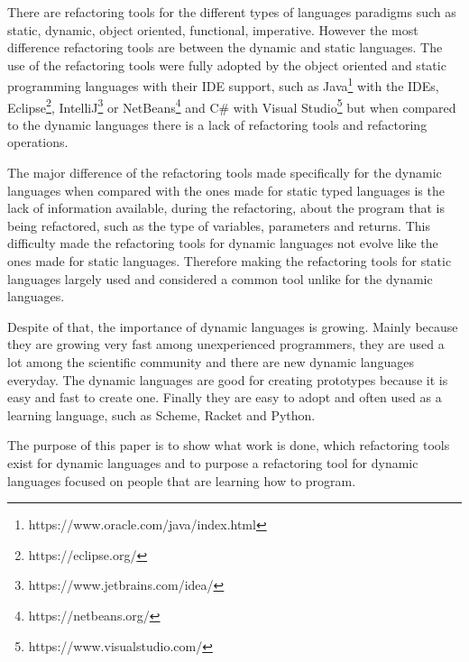 There are refactoring tools for the different types of languages paradigms such as static, dynamic, object oriented, functional, imperative. However the most difference refactoring tools are between the dynamic and static languages. The use of the refactoring tools were fully adopted by the object oriented and static programming languages with their IDE support, such as Java\footnote{https://www.oracle.com/java/index.html} with the IDEs, Eclipse\footnote{https://eclipse.org/}, IntelliJ\footnote{https://www.jetbrains.com/idea/} or NetBeans\footnote{https://netbeans.org/} and C\# with Visual Studio\footnote{https://www.visualstudio.com/} but when %
compared to the dynamic languages there is a lack of refactoring tools and refactoring operations.

The major difference of the refactoring tools made specifically for the dynamic languages when compared with the ones made for static typed languages is the lack of information available, during the refactoring, about the program that is being refactored, such as the type of variables, parameters and returns. 
This difficulty made the refactoring tools for dynamic languages not evolve like the ones made for static languages. 
Therefore making the refactoring tools for static languages largely used and considered a common tool unlike for the dynamic languages.  %

Despite of that, the importance of dynamic languages is growing. Mainly because they are growing very fast among unexperienced programmers, they are used a lot among the scientific community and there are new dynamic languages everyday. 
The dynamic languages are good for creating prototypes because it is easy and fast to create one. Finally they are easy to adopt and often used as a learning language, such as Scheme, Racket and Python. %


The purpose of this paper is to show what work is done, which refactoring tools exist for dynamic languages and to purpose a refactoring tool for dynamic languages focused on people that are learning how to program. %








